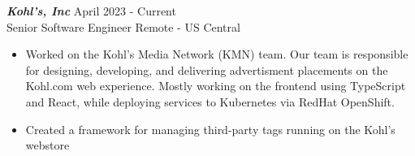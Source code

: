 {\sl \textbf{Kohl's, Inc}} \hfill April 2023 - Current \\ Senior Software Engineer \hfill Remote - US Central
\begin{itemize}
    \item Worked on the Kohl's Media Network (KMN) team. Our team is responsible for designing, developing, and delivering advertisment placements on the Kohl.com web experience. Mostly working on the frontend using TypeScript and React, while deploying services to Kubernetes via RedHat OpenShift.
    \item Created a framework for managing third-party tags running on the Kohl's webstore
\end{itemize}